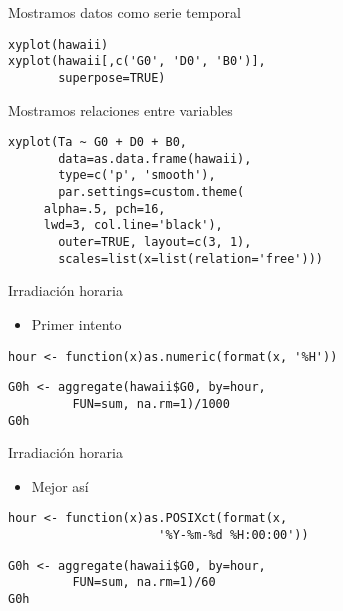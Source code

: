 \documentclass[xcolor={usenames,svgnames,dvipsnames}]{beamer}
\begin{document}
\begin{frame}[fragile,label=sec-4-3]{Mostramos datos como serie temporal}
 \lstset{language=R,numbers=none}
\begin{lstlisting}
xyplot(hawaii)
xyplot(hawaii[,c('G0', 'D0', 'B0')],
       superpose=TRUE)
\end{lstlisting}
\end{frame}
\begin{frame}[fragile,label=sec-4-4]{Mostramos relaciones entre variables}
 \lstset{language=R,numbers=none}
\begin{lstlisting}
xyplot(Ta ~ G0 + D0 + B0,
       data=as.data.frame(hawaii),
       type=c('p', 'smooth'),
       par.settings=custom.theme(
	 alpha=.5, pch=16,
	 lwd=3, col.line='black'),
       outer=TRUE, layout=c(3, 1),
       scales=list(x=list(relation='free')))
\end{lstlisting}
\end{frame}
\begin{frame}[fragile,label=sec-4-5]{Irradiación horaria}
 \begin{itemize}
\item Primer intento
\end{itemize}
\lstset{language=R,numbers=none}
\begin{lstlisting}
hour <- function(x)as.numeric(format(x, '%H'))
\end{lstlisting}

\lstset{language=R,numbers=none}
\begin{lstlisting}
G0h <- aggregate(hawaii$G0, by=hour,
		 FUN=sum, na.rm=1)/1000
G0h
\end{lstlisting}
\end{frame}
\begin{frame}[fragile,label=sec-4-6]{Irradiación horaria}
 \begin{itemize}
\item Mejor así
\end{itemize}
\lstset{language=R,numbers=none}
\begin{lstlisting}
hour <- function(x)as.POSIXct(format(x,
				     '%Y-%m-%d %H:00:00'))
\end{lstlisting}

\lstset{language=R,numbers=none}
\begin{lstlisting}
G0h <- aggregate(hawaii$G0, by=hour,
		 FUN=sum, na.rm=1)/60
G0h
\end{lstlisting}
\end{frame}
\end{document}
